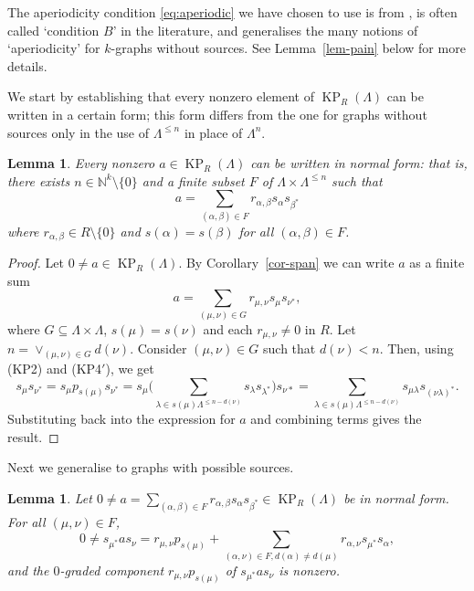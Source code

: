 \documentclass[a4paper,12pt]{amsart}
\numberwithin{equation}{section}
\newtheorem{lemma}[thm]{Lemma}
\theoremstyle{definition}
\theoremstyle{remark}
\begin{document}
The aperiodicity condition \eqref{eq:aperiodic} we have chosen to use is from  
\cite[Theorem~4.3]{RSY03}, is often called `condition $B$' in the literature, and generalises the many  notions of
 `aperiodicity' for $k$-graphs without sources.  See Lemma~\ref{lem-pain} below for more details. 

We start by establishing that every nonzero element of $\operatorname{KP}_R(\Lambda)$ can be 
written in a certain form; this form differs from the one for graphs without sources only in the use of 
$\Lambda^{\leq n}$ in place of $\Lambda^n$.
    
\begin{lemma}
\label{lem:11}
Every nonzero $a \in \operatorname{KP}_R(\Lambda)$ 
can be written in normal form: that is, there exists $n \in {\mathbb{N}}^k \setminus\{0\}$ 
and a finite subset $F$ of $\Lambda \times \Lambda^{\leq n}$ such that
\[ a = \sum_{(\alpha, \beta) \in F} r_{\alpha, \beta}s_\alpha s_{\beta^{*}}\]
where $r_{\alpha,\beta} \in R\setminus\{0\}$ and $s(\alpha)=s(\beta)$ for all $(\alpha,\beta)\in F$.
\end{lemma}

\begin{proof}
Let $0\neq a \in \operatorname{KP}_R(\Lambda)$. By Corollary~\ref{cor-span} we can write $a$ as a finite sum 
 \[a=\sum_{(\mu,\nu) \in G} r_{\mu,\nu}s_\mu s_{\nu^{*}},\]
where $G \subseteq \Lambda \times \Lambda$, $s(\mu)=s(\nu)$ and each $r_{\mu,\nu}\neq 0$ in $R$. 
Let $n=\vee_{(\mu,\nu) \in G} d(\nu)$. Consider $(\mu,\nu)\in G$ such that $d(\nu)<n$. Then, using (KP2) and  (KP4$'$), we get
\[
s_\mu s_{\nu^{*}} = s_\mu p_{s(\mu)} s_{\nu^{*}}=s_\mu\Big(\sum_{\lambda \in s(\mu)\Lambda^{\leq n-d(\nu)}} s_\lambda s_{\lambda^{*}}\Big) s_{\nu{*}}=\sum_{\lambda \in s(\mu)\Lambda^{\leq n-d(\nu)}}s_{\mu\lambda} s_{(\nu\lambda)^{*}}.
\]
Substituting back into the expression for $a$ and combining terms gives the result.
\end{proof}

Next we generalise \cite[Lemma~2.3(1)]{BaH} to graphs with possible sources.

\begin{lemma}
\label{lem:AaHRS4.3}
Let $0\neq a=\sum_{(\alpha,\beta) \in F} r_{\alpha,\beta}s_\alpha s_{\beta^*}\in\operatorname{KP}_R(\Lambda)$ be in normal form. For all $(\mu,\nu)\in F$, 
\begin{equation}\label{eq:4.2}
0 \neq s_{\mu^*}as_\nu = r_{\mu,\nu}p_{s(\mu)}+\sum_{(\alpha,\nu)\in F, d(\alpha)\neq d(\mu)} 
r_{\alpha,\nu}s_{\mu^*}s_\alpha,\end{equation}
and the $0$-graded component $r_{\mu,\nu}p_{s(\mu)}$ of $s_{\mu^*}as_\nu$ is nonzero.
\end{lemma}
\end{document}
